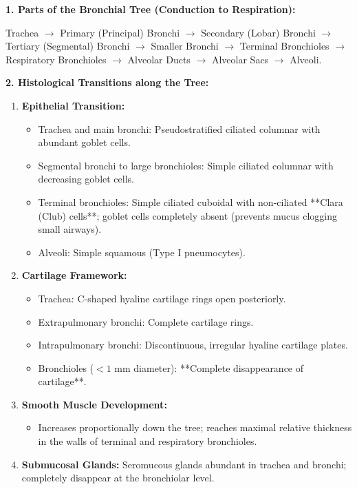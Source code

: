 \documentclass[11pt,a4paper]{article}
\begin{document}
\begin{ansbox}
\textbf{1. Parts of the Bronchial Tree (Conduction to Respiration):}
\begin{center}
Trachea $\rightarrow$ Primary (Principal) Bronchi $\rightarrow$ Secondary (Lobar) Bronchi $\rightarrow$ Tertiary (Segmental) Bronchi $\rightarrow$ Smaller Bronchi $\rightarrow$ Terminal Bronchioles $\rightarrow$ Respiratory Bronchioles $\rightarrow$ Alveolar Ducts $\rightarrow$ Alveolar Sacs $\rightarrow$ Alveoli.
\end{center}

\textbf{2. Histological Transitions along the Tree:}
\begin{enumerate}[leftmargin=*]
    \item \textbf{Epithelial Transition:}
    \begin{itemize}
        \item Trachea and main bronchi: Pseudostratified ciliated columnar with abundant goblet cells.
        \item Segmental bronchi to large bronchioles: Simple ciliated columnar with decreasing goblet cells.
        \item Terminal bronchioles: Simple ciliated cuboidal with non-ciliated **Clara (Club) cells**; goblet cells completely absent (prevents mucus clogging small airways).
        \item Alveoli: Simple squamous (Type I pneumocytes).
    \end{itemize}
    \item \textbf{Cartilage Framework:}
    \begin{itemize}
        \item Trachea: C-shaped hyaline cartilage rings open posteriorly.
        \item Extrapulmonary bronchi: Complete cartilage rings.
        \item Intrapulmonary bronchi: Discontinuous, irregular hyaline cartilage plates.
        \item Bronchioles ($<1$ mm diameter): **Complete disappearance of cartilage**.
    \end{itemize}
    \item \textbf{Smooth Muscle Development:}
    \begin{itemize}
        \item Increases proportionally down the tree; reaches maximal relative thickness in the walls of terminal and respiratory bronchioles.
    \end{itemize}
    \item \textbf{Submucosal Glands:} Seromucous glands abundant in trachea and bronchi; completely disappear at the bronchiolar level.
\end{enumerate}
\end{ansbox}
\end{document}
